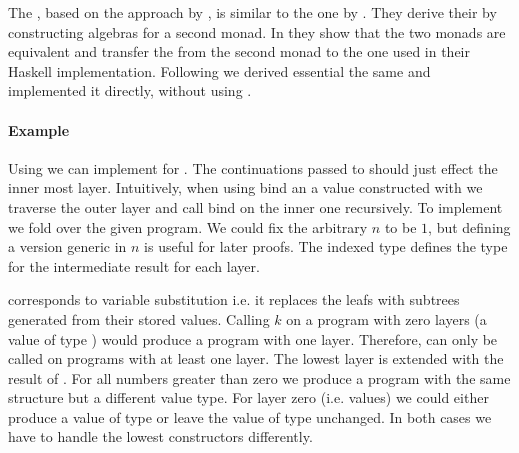 The , based on the approach by
\textcite{DBLP:journals/corr/abs-1806-05230}, is similar to the one by
\textcite{DBLP:conf/lics/PirogSWJ18}.
They derive their  by constructing algebras for a
second monad.
In  they show that the two monads are
equivalent and transfer the  from the
second monad to the one used in their Haskell implementation.
Following \textcite{DBLP:journals/corr/abs-1806-05230} we derived essential the
same  and implemented it directly, without using
\AgdaFunction{>>=}.

\paragraph{Example}
Using  we can implement \AgdaFunction{>>=} for
\AgdaSpace{}\AgdaSpace{}.
The continuations  passed to \AgdaFunction{>>=} should just
effect the inner most layer.
Intuitively, when using bind an a value constructed with
 we traverse the outer layer and call bind on the
inner one recursively.
To implement \AgdaFunction{>>=} we fold over the given program.
We could fix the arbitrary $n$ to be $1$, but defining a version generic in $n$
is useful for later proofs.
The  indexed type  defines the type for the
intermediate result for each layer.

\AgdaFunction{>>=} corresponds to variable substitution i.e. it replaces the
 leafs with subtrees generated from their stored
values.
Calling $k$ on a program with zero layers (a value of type )
would produce a program with one layer.
Therefore, \bind{} can only be called on programs with at least one layer.
The lowest layer is extended with the result of .
For all numbers greater than zero we produce a program with the same structure
but a different value type.
For layer zero (i.e. values) we could either produce a value of type 
\AgdaSpace{}\AgdaSpace{}
or leave the value of type  unchanged.
In both cases we have to handle the lowest 
constructors differently.

